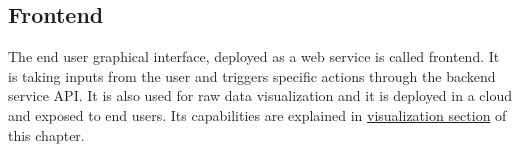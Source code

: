 \subsection{Frontend}
The end user graphical interface, deployed as a web service is called frontend. It is taking inputs from the user and triggers specific actions through the backend service API. It is also used for raw data visualization and it is deployed in a cloud and exposed to end users. Its capabilities are explained in \hyperref[sec:0308]{visualization section} of this chapter.